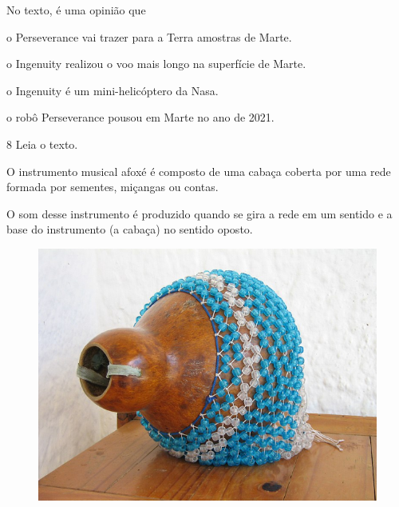 
No texto, é uma opinião que

\begin{escolha}
\item o Perseverance vai trazer para a Terra amostras de Marte.

\item o Ingenuity realizou o voo mais longo na superfície de Marte.

\item o Ingenuity é um mini-helicóptero da Nasa.

\item o robô Perseverance pousou em Marte no ano de 2021.
\end{escolha}



\num{8}  Leia o texto.

\begin{myquote}
O instrumento musical afoxé é composto de uma cabaça coberta por uma
rede formada por sementes, miçangas ou contas.

O som desse instrumento é
produzido quando se gira a rede em um sentido e a base do instrumento (a
cabaça) no sentido oposto.
\end{myquote}

\begin{figure}[htpb!]
\centering
\includegraphics[width=\textwidth]{./imgs/art33.png}
\end{figure}

